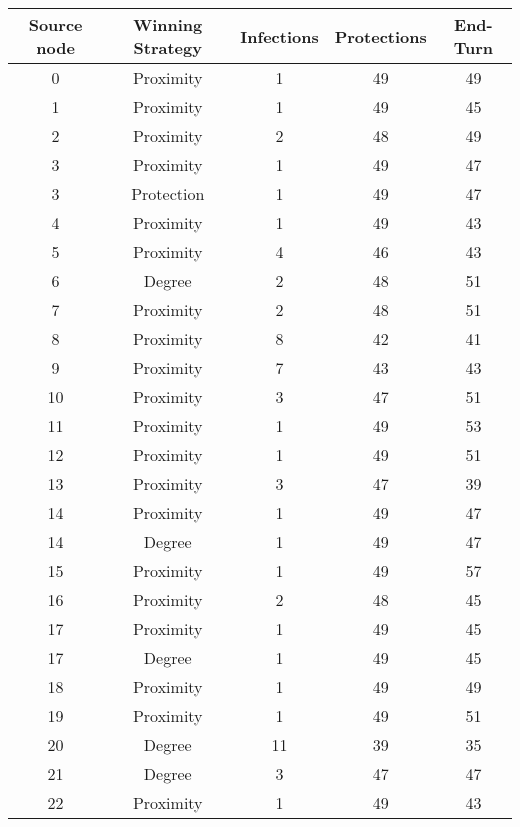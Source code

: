 \documentclass[results.tex]{subfiles}
\begin{document}
\begin{center}
  \begin{tabular}{| c || c | c | c | c |}
    \hline
    {\bfseries Source node} & {\bfseries Winning Strategy} & {\bfseries Infections} & {\bfseries Protections} & {\bfseries End-Turn} \\  %
    \hline\hline
    0 & Proximity & 1 & 49 & 49 \\ 
    \hline
    1 & Proximity & 1 & 49 & 45 \\ 
    \hline
    2 & Proximity & 2 & 48 & 49 \\ 
    \hline
    3 & Proximity & 1 & 49 & 47 \\ 
    \hline
    3 & Protection & 1 & 49 & 47 \\ 
    \hline
    4 & Proximity & 1 & 49 & 43 \\ 
    \hline
    5 & Proximity & 4 & 46 & 43 \\ 
    \hline
    6 & Degree & 2 & 48 & 51 \\ 
    \hline
    7 & Proximity & 2 & 48 & 51 \\ 
    \hline
    8 & Proximity & 8 & 42 & 41 \\ 
    \hline
    9 & Proximity & 7 & 43 & 43 \\ 
    \hline
    10 & Proximity & 3 & 47 & 51 \\ 
    \hline
    11 & Proximity & 1 & 49 & 53 \\ 
    \hline
    12 & Proximity & 1 & 49 & 51 \\ 
    \hline
    13 & Proximity & 3 & 47 & 39 \\ 
    \hline
    14 & Proximity & 1 & 49 & 47 \\ 
    \hline
    14 & Degree & 1 & 49 & 47 \\ 
    \hline
    15 & Proximity & 1 & 49 & 57 \\ 
    \hline
    16 & Proximity & 2 & 48 & 45 \\ 
    \hline
    17 & Proximity & 1 & 49 & 45 \\ 
    \hline
    17 & Degree & 1 & 49 & 45 \\ 
    \hline
    18 & Proximity & 1 & 49 & 49 \\ 
    \hline
    19 & Proximity & 1 & 49 & 51 \\ 
    \hline
    20 & Degree & 11 & 39 & 35 \\ 
    \hline
    21 & Degree & 3 & 47 & 47 \\ 
    \hline
    22 & Proximity & 1 & 49 & 43 \\ 

\end{tabular}
\end{center}
\end{document}
